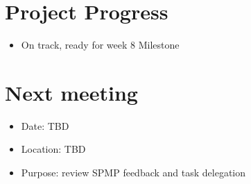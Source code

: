 \documentclass[11pt, a4paper]{article}
\begin{document}
\section{Project Progress}
\begin{itemize}
\item On track, ready for week 8 Milestone
\end{itemize}



\section{Next meeting}
\begin{itemize}
\item Date: TBD
\item Location: TBD
\item Purpose: review SPMP feedback and task delegation
\end{itemize}

\vspace*{10pt}
\end{document}
